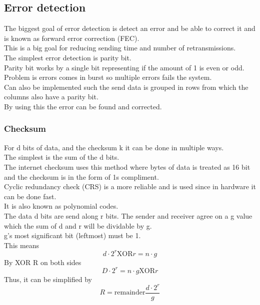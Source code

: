 \documentclass[12pt, a4paper]{article}
\begin{document}
		\subsection{Error detection}
			The biggest goal of error detection is detect an error and be able to correct it and is known as forward error correction (FEC).\\
			This is a big goal for reducing sending time and number of retransmissions.\\[4mm]
			The simplest error detection is parity bit.\\
			Parity bit works by a single bit representing if the amount of 1 is even or odd.\\
			Problem is errors comes in burst so multiple errors fails the system.\\
			Can also be implemented such the send data is grouped in rows from which the columns also have a parity bit.\\
			By using this the error can be found and corrected.\\
			\subsubsection{Checksum}
				For d bits of data, and the checksum k it can be done in multiple ways.\\
				The simplest is the sum of the d bits.\\
				The internet checksum uses this method where bytes of data is treated as 16 bit and the checksum is in the form of 1s compliment.\\
				Cyclic redundancy check (CRS) is a more reliable and is used since in hardware it can be done fast.\\
				It is also known as polynomial codes.\\
				The data d bits are send along r bits. The sender and receiver agree on a g value which the sum of d and r will be dividable by g.\\
				g's most significant bit (leftmost) must be 1.\\
				This means\\
				$$d\cdot 2^r\text{XOR}r=n\cdot g$$
				By XOR R on both sides
				$$D\cdot 2^r=n\cdot g\text{XOR} r$$
				Thus, it can be simplified by
				$$R=\text{remainder}\frac{d\cdot 2^r}{g}$$
\end{document}
